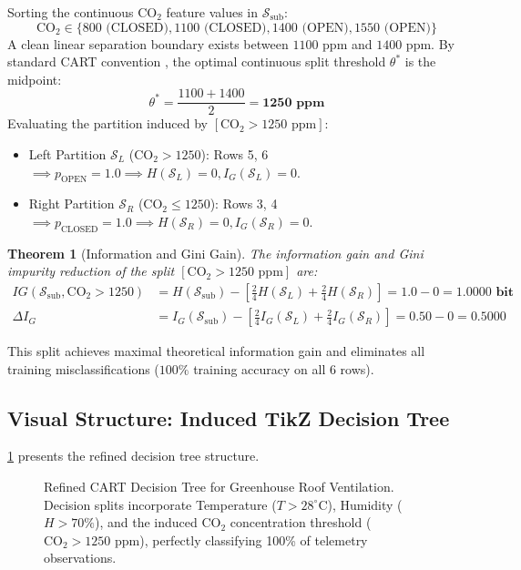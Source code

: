 \documentclass[11pt,a4paper]{article}
\theoremstyle{definition}
\theoremstyle{plain}
\newtheorem{theorem}{Theorem}[section]
\theoremstyle{remark}
\begin{document}
Sorting the continuous $\text{CO}_2$ feature values in $\mathcal{S}_{\text{sub}}$:
\begin{equation}
\text{CO}_2 \in \{800 \text{ (CLOSED)}, 1100 \text{ (CLOSED)}, 1400 \text{ (OPEN)}, 1550 \text{ (OPEN)}\}
\end{equation}
A clean linear separation boundary exists between $1100\text{ ppm}$ and $1400\text{ ppm}$. By standard CART convention \cite{breiman1984classification}, the optimal continuous split threshold $\theta^*$ is the midpoint:
\begin{equation}
\theta^* = \frac{1100 + 1400}{2} = \mathbf{1250\text{ ppm}}
\end{equation}
Evaluating the partition induced by $[\text{CO}_2 > 1250\text{ ppm}]$:
\begin{itemize}[noitemsep]
    \item Left Partition $\mathcal{S}_L$ ($\text{CO}_2 > 1250$): Rows 5, 6 $\implies p_{\text{OPEN}} = 1.0 \implies H(\mathcal{S}_L) = 0, I_G(\mathcal{S}_L) = 0$.
    \item Right Partition $\mathcal{S}_R$ ($\text{CO}_2 \le 1250$): Rows 3, 4 $\implies p_{\text{CLOSED}} = 1.0 \implies H(\mathcal{S}_R) = 0, I_G(\mathcal{S}_R) = 0$.
\end{itemize}

\begin{theorem}[Information and Gini Gain]
The information gain and Gini impurity reduction of the split $[\text{CO}_2 > 1250\text{ ppm}]$ are:
\begin{align}
IG(\mathcal{S}_{\text{sub}}, \text{CO}_2 > 1250) &= H(\mathcal{S}_{\text{sub}}) - \left[\frac{2}{4}H(\mathcal{S}_L) + \frac{2}{4}H(\mathcal{S}_R)\right] = 1.0 - 0 = \mathbf{1.0000 \text{ bit}} \\
\Delta I_G &= I_G(\mathcal{S}_{\text{sub}}) - \left[\frac{2}{4}I_G(\mathcal{S}_L) + \frac{2}{4}I_G(\mathcal{S}_R)\right] = 0.50 - 0 = \mathbf{0.5000}
\end{align}
\end{theorem}
This split achieves maximal theoretical information gain and eliminates all training misclassifications ($100\%$ training accuracy on all 6 rows).

\subsection{Visual Structure: Induced TikZ Decision Tree}
\cref{fig:greenhouse_tree_submission} presents the refined decision tree structure.

\begin{figure}[htbp]
\centering

\caption{Refined CART Decision Tree for Greenhouse Roof Ventilation. Decision splits incorporate Temperature ($T > 28^\circ\text{C}$), Humidity ($H > 70\%$), and the induced $\text{CO}_2$ concentration threshold ($\text{CO}_2 > 1250\text{ ppm}$), perfectly classifying 100\% of telemetry observations.}
\label{fig:greenhouse_tree_submission}
\end{figure}
\end{document}

